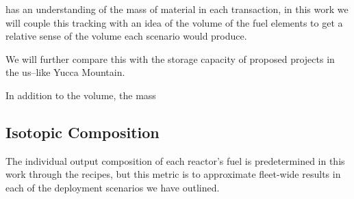 \cyclus has an understanding of the mass of material in each
transaction, in this work we will couple this tracking with an idea of
the volume of the fuel elements to get a relative sense of the volume
each scenario would produce.

We will further compare this with the storage capacity of proposed
projects in the \gls{us}--like Yucca Mountain.

In addition to the volume, the mass %

\subsection{Isotopic Composition}

The individual output composition of each reactor's fuel is
predetermined in this work through the recipes, but this metric is to
approximate fleet-wide results in each of the deployment scenarios we
have outlined.